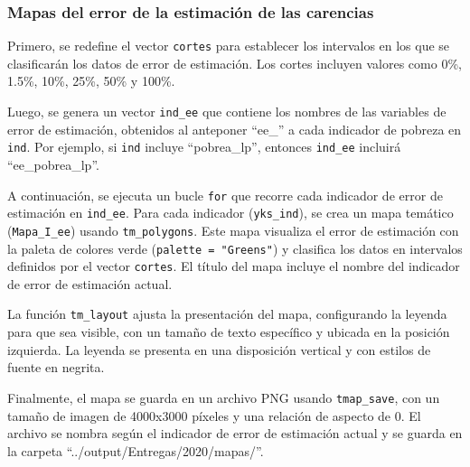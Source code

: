 \documentclass[
  12pt,
]{book}
\begin{document}
\hypertarget{mapas-del-error-de-la-estimaciuxf3n-de-las-carencias}{%
\subsubsection*{Mapas del error de la estimación de las carencias}\label{mapas-del-error-de-la-estimaciuxf3n-de-las-carencias}}

Primero, se redefine el vector \texttt{cortes} para establecer los intervalos en los que se clasificarán los datos de error de estimación. Los cortes incluyen valores como 0\%, 1.5\%, 10\%, 25\%, 50\% y 100\%.

Luego, se genera un vector \texttt{ind\_ee} que contiene los nombres de las variables de error de estimación, obtenidos al anteponer ``ee\_'' a cada indicador de pobreza en \texttt{ind}. Por ejemplo, si \texttt{ind} incluye ``pobrea\_lp'', entonces \texttt{ind\_ee} incluirá ``ee\_pobrea\_lp''.

A continuación, se ejecuta un bucle \texttt{for} que recorre cada indicador de error de estimación en \texttt{ind\_ee}. Para cada indicador (\texttt{yks\_ind}), se crea un mapa temático (\texttt{Mapa\_I\_ee}) usando \texttt{tm\_polygons}. Este mapa visualiza el error de estimación con la paleta de colores verde (\texttt{palette\ =\ "Greens"}) y clasifica los datos en intervalos definidos por el vector \texttt{cortes}. El título del mapa incluye el nombre del indicador de error de estimación actual.

La función \texttt{tm\_layout} ajusta la presentación del mapa, configurando la leyenda para que sea visible, con un tamaño de texto específico y ubicada en la posición izquierda. La leyenda se presenta en una disposición vertical y con estilos de fuente en negrita.

Finalmente, el mapa se guarda en un archivo PNG usando \texttt{tmap\_save}, con un tamaño de imagen de 4000x3000 píxeles y una relación de aspecto de 0. El archivo se nombra según el indicador de error de estimación actual y se guarda en la carpeta ``../output/Entregas/2020/mapas/''.
\end{document}
